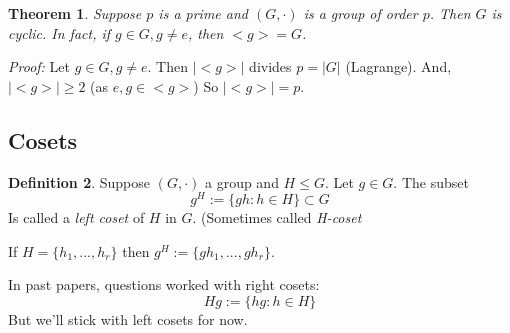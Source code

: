 \documentclass{report}
\newtheorem{theorem}{Theorem}[subsection]
\theoremstyle{remark}
\theoremstyle{definition}
\newtheorem{definition}[theorem]{Definition}
\theoremstyle{definition}
\theoremstyle{theorem}
\begin{document}
\begin{theorem}
Suppose $p$ is a prime and $(G, \cdot)$ is a group of order $p$. Then $G$ is cyclic. In fact, if $g \in G, g \neq e$, then $<g>=G$.
\end{theorem}
\emph{Proof:} Let $g \in G, g \neq e$. Then $|<g>|$ divides $p=|G|$ (Lagrange). And, $|<g>| \geq 2$ (as $e,g \in <g>$) So $|<g>|=p$.
\subsection{Cosets}
\begin{definition}
Suppose $(G,\cdot)$ a group and $H \leq G$. Let $g \in G$. The subset
\[g^H:=\{gh:h \in H\} \subset G\]
Is called a \emph{left coset} of $H$ in $G$. (Sometimes called \emph{H-coset}
\end{definition}
If $H=\{h_1,...,h_r\}$ then $g^H:=\{gh_1,...,gh_r\}$.\par
In past papers, questions worked with right cosets:
\[Hg:=\{hg:h \in H\}\]
But we'll stick with left cosets for now.
\end{document}
